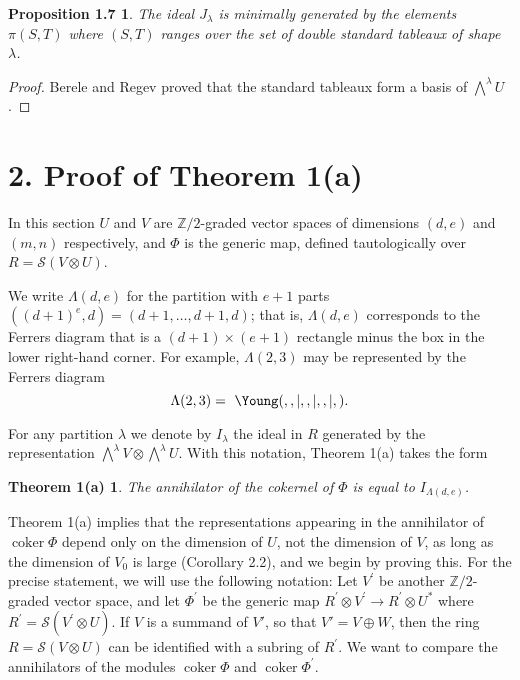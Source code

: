 \documentclass{tran-l}
\theoremstyle{plain}
\newtheorem*{theorem9}{Proposition 1.7}
\newtheorem*{theorem10}{Theorem 1(a)}
\theoremstyle{remark}
\theoremstyle{definition}
\newcommand{\myS}{{\mathcal S}}
\newcommand{\coker}{\operatorname{coker}}
\newcommand{\ZZ}{\mathbb {Z}}
\begin{document}
\begin{theorem9} The ideal $J_{\lambda }$ is
minimally generated by the elements $\pi (S,T)$ where
$(S,T)$ ranges over the set of double standard tableaux
of shape $\lambda $.
\end{theorem9}
\begin{proof} Berele and Regev proved that 
the standard tableaux form a basis of $\bigwedge ^{\lambda }U$.
\end{proof}
\section*{2. Proof of Theorem 1(\textup{a})}

In this section
$U$ and
$V$ are $\ZZ /2$-graded vector spaces of dimensions $(d,e)$
and $(m,n)$ respectively, and $\Phi $ is the generic map,
defined tautologically over $R=\myS (V\otimes U)$.

We write $\Lambda (d,e)$ for the partition with
$e+1$ parts $((d+1)^{e},d)=(d+1,\dots ,d+1,d)$;
that is,
$\Lambda (d,e)$ corresponds to the Ferrers diagram
that is a
$(d+1)\times (e+1)$ rectangle minus the box in the lower
right-hand corner.
For example, $\Lambda (2,3)$ may be represented by the Ferrers
 diagram
\begin{equation*}\Lambda (2,3) =\ \Young (,,|,,|,,|,).
\end{equation*}

For any
partition $\lambda $ we denote by $I_{\lambda }$ the
ideal in $R$ generated
by the representation $\bigwedge ^{\lambda }V\otimes \bigwedge ^{\lambda }U$.
With this notation, Theorem 1(a) takes the form

\begin{theorem10} The annihilator of the cokernel of $\Phi $
is equal to $I_{\Lambda (d,e)}$.
\end{theorem10}


Theorem 1(a) implies that the representations
appearing in the annihilator of $\coker \Phi $ depend
only on the dimension of $U$, not the
dimension of $V$, as long as the dimension of $V_{0}$ is large
(Corollary 2.2), and we begin by proving this.
For the precise statement, we will use the following notation:
Let $V^{\prime }$ be another $\ZZ /2$-graded
vector space, and let
$\Phi ^{\prime }$ be the generic map $R^{\prime }\otimes V^{\prime }\to R^{\prime }\otimes U^{*}$
where $R^{\prime }= \myS (V^{\prime }\otimes U )$.
If $V$ is a summand of $V'$, so that $V'=V\oplus W$,
then the ring $R=\myS (V\otimes U)$ can be identified with a subring of
$R^{\prime }$. We want to compare the
annihilators of the modules $\coker \Phi $ and
$\coker \Phi ^{\prime }$.
\end{document}

